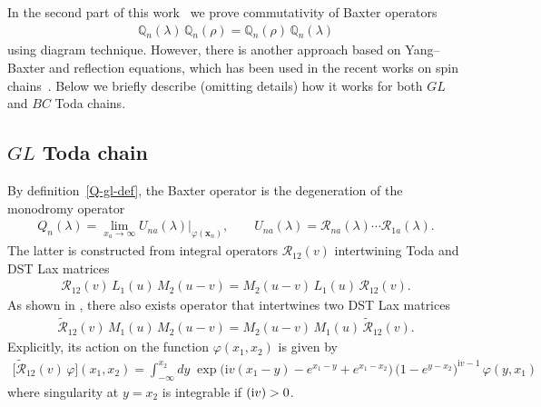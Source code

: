 \documentclass[11pt]{article}
\numberwithin{equation}{section}
\theoremstyle{plain}
\theoremstyle{definition}
\newcommand{\QQ}{\mathbb{Q}}
\let\Re\relax
\DeclareMathOperator{\Re}{Re}
\renewcommand{\phi}{\varphi}
\renewcommand{\imath}{\mathrm{i}}
\begin{document}
In the second part of this work~\cite{BDK} we prove commutativity of Baxter operators
\begin{align}
	\QQ_n(\lambda) \, \QQ_n(\rho) = \QQ_n(\rho) \, \QQ_n(\lambda)
\end{align}
using diagram technique. However, there is another approach based on Yang--Baxter and reflection equations, which has been used in the recent works on spin chains~\cite{ADV, ADV2}. Below we briefly describe (omitting details) how it works for both $GL$ and $BC$ Toda chains.

\subsection{$GL$ Toda chain}

By definition~\eqref{Q-gl-def}, the Baxter operator is the degeneration of the monodromy operator
\begin{align} \label{Q-gl-def-2}
	Q_n(\lambda)  = \lim_{x_{a} \to \infty} U_{na}(\lambda) \bigr|_{\phi(\bm{x}_n)}, \qquad  U_{na}(\lambda) = \mathcal{R}_{na}(\lambda) \cdots \mathcal{R}_{1a}(\lambda).
\end{align}
The latter is constructed from integral operators $\mathcal{R}_{12}(v)$ intertwining Toda and DST Lax matrices
\begin{align} \label{RLM-3}
	\mathcal{R}_{12}(v) \, L_1(u) \, M_2(u - v) = M_2(u - v) \, L_1(u) \, \mathcal{R}_{12}(v).
\end{align}
As shown in \cite{KSS}, there also exists operator that intertwines two DST Lax matrices
\begin{align}\label{RMM}
	\widetilde{\mathcal{R}}_{12}(v) \, M_1(u) \, M_2(u - v) = M_2(u - v) \, M_1(u) \, \widetilde{\mathcal{R}}_{12}(v).
\end{align}
Explicitly, its action on the function $\phi(x_1, x_2)$ is given by
\begin{align}\label{Rh}
	\bigl[ \widetilde{\mathcal{R}}_{12} (v)\, \phi \bigr](x_1, x_2) = \int_{-\infty}^{x_2} dy \;\exp \bigl( \imath v(x_1 - y) - e^{x_1 - y} + e^{x_1 - x_2} \bigr) \, \bigl(1 - e^{y- x_2} \bigr)^{\imath v - 1} \,  \phi(y, x_1)
\end{align}
where singularity at $y = x_2$ is integrable if $\Re (\imath v) > 0$. 
\end{document}
